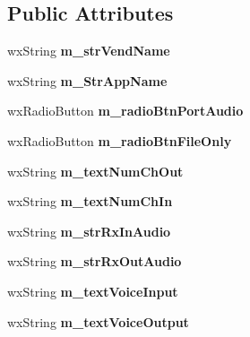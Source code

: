 \subsection*{Public Attributes}
\begin{DoxyCompactItemize}
\item 
\hypertarget{class_main_app_a5a666c9feecd113dfd3b2f522b6d5fc9}{wx\-String {\bfseries m\-\_\-str\-Vend\-Name}}\label{class_main_app_a5a666c9feecd113dfd3b2f522b6d5fc9}

\item 
\hypertarget{class_main_app_a49d0cc802b97b1309a9d96c5c85b83b6}{wx\-String {\bfseries m\-\_\-\-Str\-App\-Name}}\label{class_main_app_a49d0cc802b97b1309a9d96c5c85b83b6}

\item 
\hypertarget{class_main_app_ae53cdf538cc560731cfff2e82da54605}{wx\-Radio\-Button {\bfseries m\-\_\-radio\-Btn\-Port\-Audio}}\label{class_main_app_ae53cdf538cc560731cfff2e82da54605}

\item 
\hypertarget{class_main_app_a25cbd9f158a2120015e154f74e768b98}{wx\-Radio\-Button {\bfseries m\-\_\-radio\-Btn\-File\-Only}}\label{class_main_app_a25cbd9f158a2120015e154f74e768b98}

\item 
\hypertarget{class_main_app_aeac0e4eef0eb34a0cb974ac9208182aa}{wx\-String {\bfseries m\-\_\-text\-Num\-Ch\-Out}}\label{class_main_app_aeac0e4eef0eb34a0cb974ac9208182aa}

\item 
\hypertarget{class_main_app_a6f04f0f61a76df541a59101b627448da}{wx\-String {\bfseries m\-\_\-text\-Num\-Ch\-In}}\label{class_main_app_a6f04f0f61a76df541a59101b627448da}

\item 
\hypertarget{class_main_app_a131c5ad5d714c9ed32a79467e788ac18}{wx\-String {\bfseries m\-\_\-str\-Rx\-In\-Audio}}\label{class_main_app_a131c5ad5d714c9ed32a79467e788ac18}

\item 
\hypertarget{class_main_app_a73d4ee823e86cc78439be9f50ce4eca1}{wx\-String {\bfseries m\-\_\-str\-Rx\-Out\-Audio}}\label{class_main_app_a73d4ee823e86cc78439be9f50ce4eca1}

\item 
\hypertarget{class_main_app_a23f3ff36360c245d7f5f1fc3e9300c91}{wx\-String {\bfseries m\-\_\-text\-Voice\-Input}}\label{class_main_app_a23f3ff36360c245d7f5f1fc3e9300c91}

\item 
\hypertarget{class_main_app_a94e76172a575851642a5b80ecf14a7b9}{wx\-String {\bfseries m\-\_\-text\-Voice\-Output}}\label{class_main_app_a94e76172a575851642a5b80ecf14a7b9}


\end{DoxyCompactItemize}
